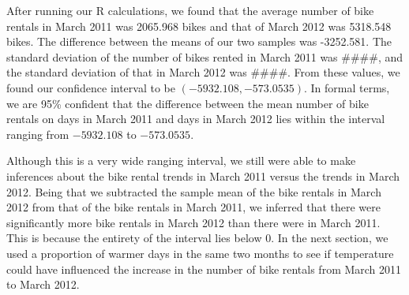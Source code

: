 \documentclass[11pt]{article}
\begin{document}
After running our R calculations, we found that the average number of bike rentals in March 2011 was 2065.968 bikes and that of March 2012 was 5318.548 bikes. The difference between the means of our two samples was -3252.581. The standard deviation of the number of bikes rented in March 2011 was \#\#\#\#, and the standard deviation of that in March 2012 was \#\#\#\#. From these values, we found our confidence interval to be $(-5932.108, -573.0535)$. In formal terms, we are 95\% confident that the difference between the mean number of bike rentals on days in March 2011 and days in March 2012 lies within the interval ranging from $-5932.108$ to $-573.0535$.  

Although this is a very wide ranging interval, we still were able to make inferences about the bike rental trends in March 2011 versus the trends in March 2012. Being that we subtracted the sample mean of the bike rentals in March 2012 from that of the bike rentals in March 2011, we inferred that there were significantly more bike rentals in March 2012 than there were in March 2011. This is because the entirety of the interval lies below 0. In the next section, we used a proportion of warmer days in the same two months to see if temperature could have influenced the increase in the number of bike rentals from March 2011 to March 2012.
\end{document}
